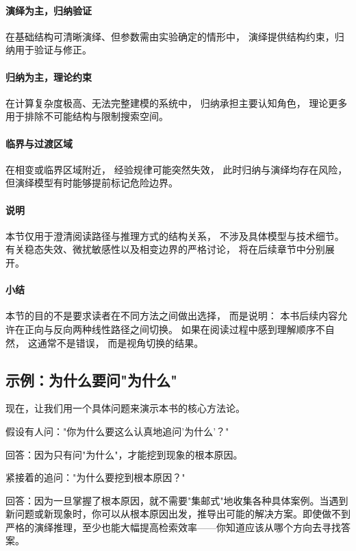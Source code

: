 \documentclass[../main.tex]{subfiles}
\begin{document}
\paragraph{演绎为主，归纳验证}
在基础结构可清晰演绎、但参数需由实验确定的情形中，
演绎提供结构约束，归纳用于验证与修正。

\paragraph{归纳为主，理论约束}
在计算复杂度极高、无法完整建模的系统中，
归纳承担主要认知角色，
理论更多用于排除不可能结构与限制搜索空间。

\paragraph{临界与过渡区域}
在相变或临界区域附近，
经验规律可能突然失效，
此时归纳与演绎均存在风险，
但演绎模型有时能够提前标记危险边界。

\paragraph{说明}
本节仅用于澄清阅读路径与推理方式的结构关系，
不涉及具体模型与技术细节。
有关稳态失效、微扰敏感性以及相变边界的严格讨论，
将在后续章节中分别展开。


\paragraph{小结}
本节的目的不是要求读者在不同方法之间做出选择，
而是说明：
本书后续内容允许在正向与反向两种线性路径之间切换。
如果在阅读过程中感到理解顺序不自然，
这通常不是错误，
而是视角切换的结果。


	\subsection{示例：为什么要问"为什么"}

现在，让我们用一个具体问题来演示本书的核心方法论。

假设有人问："你为什么要这么认真地追问'为什么'？"

回答：因为只有问"为什么"，才能挖到现象的根本原因。

紧接着的追问："为什么要挖到根本原因？"

回答：因为一旦掌握了根本原因，就不需要"集邮式"地收集各种具体案例。当遇到新问题或新现象时，你可以从根本原因出发，推导出可能的解决方案。即使做不到严格的演绎推理，至少也能大幅提高检索效率——你知道应该从哪个方向去寻找答案。
\end{document}
